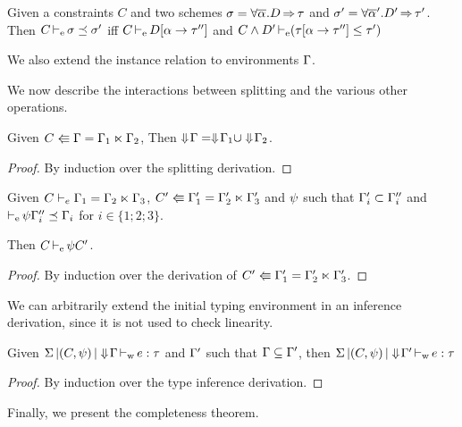 \begin{definition}
  Given a constraints $C$ and two schemes
  $\schm = \forall \Multi\tvar. \qual{D}{\tau}$ and
  $\schm' = \forall \Multi\tvar'. \qual{D'}{\tau'} $.
  Then $\entail{C}{\schm \preceq \schm'}$
  iff $\entail{C}{\subst{\tvar}{\tau''} D}$
  and $\entail{C\Cand D'}{\Cleq{\subst{\tvar}{\tau''}\tau}{\tau'}}$
\end{definition}

We also extend the instance relation to environments $\E$.


We now describe the interactions between splitting and the
various other operations.

\begin{lemma}
  \label{split:flat}
  Given $\bsplit{C}{\E}{\E_1}{\E_2}$, Then $\Eflat\E = \Eflat\E_1 \cup \Eflat\E_2$.
  \begin{proof}
    By induction over the splitting derivation.
  \end{proof}
\end{lemma}


\begin{lemma}
  \label{split:gen}
  Given $\lsplit{C}{\E_1}{\E_2}{\E_3}$,
  $\bsplit{C'}{\E'_1}{\E'_2}{\E'_3}$
  and $\unif$ such that
  $\E'_i\subset\E''_i$ and $\entail{}{\unif\E''_i \preceq \E_i}$
  for $i\in\{1;2;3\}$.

  Then $\entail{C}{\unif C'}$.
\begin{proof}
  By induction over the derivation of $\bsplit{C'}{\E'_1}{\E'_2}{\E'_3}$.
\end{proof}
\end{lemma}


We can arbitrarily extend the initial typing environment in an inference
derivation, since
it is not used to check linearity.

\begin{lemma}
  \label{infer:extend}
  Given $\inferW{\Sv}{(C,\unif)}{\Eflat\E}{e}{\tau}$ and $\E'$ such
  that $\E \subseteq \E'$, then $\inferW{\Sv}{(C,\unif)}{\Eflat\E'}{e}{\tau}$
  \begin{proof}
    By induction over the type inference derivation.
  \end{proof}
\end{lemma}

Finally, we present the completeness theorem.

